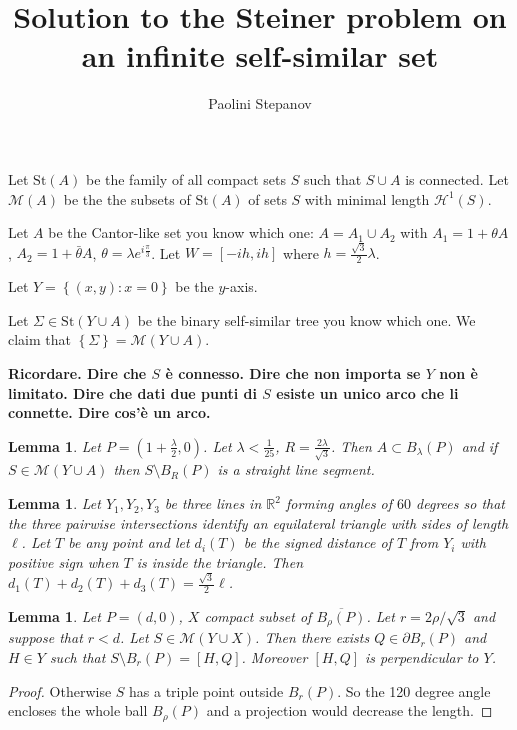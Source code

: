 \documentclass{article}
\title{Solution to the Steiner problem on an infinite self-similar set}
\author{Paolini Stepanov}
\newcommand{\RR}{\mathbb R}
\renewcommand{\H}{\mathcal H}
\newcommand{\ENCLOSE}[1]{\left\{#1\right\}}
\newcommand{\St}{\mathrm{St}}
\newcommand{\M}{\mathcal{M}}
\renewcommand{\H}{\mathcal{H}}
\newtheorem{lemma}[theorem]{Lemma}
\theoremstyle{definition}
\theoremstyle{remark}
\begin{document}
\maketitle
Let $\St(A)$ be the family of all compact sets $S$ such that 
$S\cup A$ is connected.
Let $\M(A)$ be the the subsets of $\St(A)$ of sets $S$ 
with minimal length $\H^1(S)$.

Let $A$ be the Cantor-like set you know which one: $A=A_1\cup A_2$ 
with $A_1 = 1+\theta A$, $A_2 = 1+\bar \theta A$,
$\theta = \lambda e^{i \frac \pi 3}$.
Let $W=[-ih,ih]$ where $h=\frac{\sqrt{3}} 2 \lambda$.

Let $Y=\ENCLOSE{(x,y)\colon x=0}$ be the $y$-axis.

Let $\Sigma\in \St(Y\cup A)$ be the binary self-similar 
tree you know which one.
We claim that $\ENCLOSE{\Sigma} = \M(Y\cup A)$.

\textbf{Ricordare. Dire che $S$ è connesso. 
Dire che non importa se $Y$ non è limitato.
Dire che dati due punti di $S$ esiste un unico arco che li connette.
Dire cos'è un arco. }

\begin{lemma}
  Let $P=(1+\frac\lambda 2,0)$. Let $\lambda<\frac 1 {25}$, $R=\frac{2\lambda}{\sqrt 3}$.
  Then $A\subset B_\lambda(P)$ and if $S\in \M(Y\cup A)$ then 
  $S\setminus B_R(P)$ is a straight line segment.
\end{lemma}

\begin{lemma}\label{lm:tripod}
  Let $Y_1,Y_2,Y_3$ be three lines in $\RR^2$
  forming angles of $60$ degrees so that 
  the three pairwise intersections identify
  an equilateral triangle with sides of length $\ell$.
  Let $T$ be any point and let $d_i(T)$ be 
  the signed distance of $T$ from $Y_i$
  with positive sign when $T$ is inside the triangle.
  Then $d_1(T) + d_2(T) + d_3(T) = \frac{\sqrt 3}{2}\ell$.
\end{lemma}

\begin{lemma}
Let $P=(d,0)$, $X$ compact subset of $\overline{B_\rho(P)}$.
Let $r=2\rho/\sqrt 3$ and suppose that $r<d$.
Let $S \in \M(Y\cup X)$.
Then there exists $Q\in \partial B_r(P)$ and $H\in Y$
such that $S\setminus B_r(P) = [H,Q]$.
Moreover $[H,Q]$ is perpendicular to $Y$.
\end{lemma}
\begin{proof}
    Otherwise $S$ has a triple point outside $B_r(P)$.
    So the 120 degree angle encloses the whole ball $B_\rho(P)$ 
    and a projection would decrease the length.
\end{proof}
\end{document}
